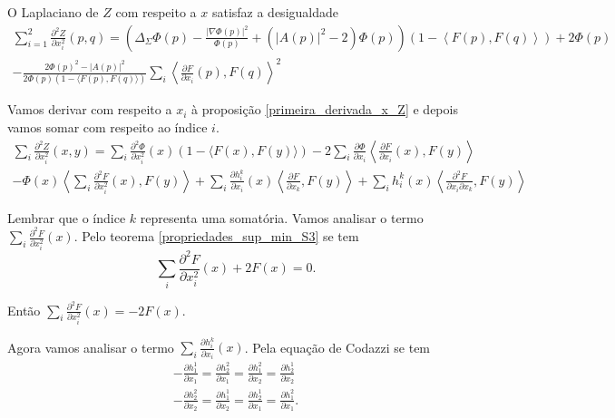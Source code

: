 \begin{proposicao}
	O Laplaciano de $Z$ com respeito a $x$ satisfaz a desigualdade
	\begin{multline*}
		\sum_{i=1}^{2} \frac{\partial^2 Z}{\partial x_i^2} (p,q) = \left( \Delta_{\Sigma} \Phi(p) - \frac{| \nabla \Phi(p) |^2}{\Phi(p)} + (|A(p)|^2 - 2) \Phi(p) \right) (1 - \left\langle F(p), F(q) \right\rangle) + 2 \Phi(p)\\
		 - \frac{2 \Phi(p)^2 - |A(p)|^2}{2 \Phi(p) (1 - \langle F(p), F(q) \rangle)} \sum_i \left\langle \frac{\partial F}{\partial x_i}(p), F(q) \right\rangle^2
	\end{multline*}
\end{proposicao}

\begin{demonstracao}
	Vamos derivar com respeito a $x_i$ à proposição \ref{primeira_derivada_x_Z} e depois vamos somar com respeito ao índice $i$.
	\begin{multline}\label{Z_seg_dev_x}
		\sum_i \frac{\partial^2 Z}{\partial x_i^2}(x,y) = \sum_i \frac{\partial^2 \Phi}{\partial x_i^2}(x)(1 - \langle F(x), F(y) \rangle) -2  \sum_i \frac{\partial \Phi}{\partial x_i} \left\langle \frac{\partial F}{\partial x_i}(x), F(y) \right\rangle\\
		 -  \Phi(x) \left\langle \sum_i \frac{\partial^2 F}{\partial x_i^2}(x), F(y) \right\rangle + \sum_i \frac{\partial h_i^k}{\partial x_i}(x) \left\langle \frac{\partial F}{\partial x_k}, F(y) \right\rangle + \sum_i h_i^k(x) \left\langle \frac{\partial^2 F}{\partial x_i \partial x_k}, F(y) \right\rangle
	\end{multline}
	
	Lembrar que o índice $k$ representa uma somatória. Vamos analisar o termo $\sum_i \frac{\partial^2 F}{\partial x_i^2}(x)$. Pelo teorema \ref{propriedades_sup_min_S3} se tem
	\begin{equation*}
		\sum_i \frac{\partial^2 F}{\partial x_i^2}(x) + 2 F(x) = 0.
	\end{equation*}
	
	Então $\sum_i \frac{\partial^2 F}{\partial x_i^2}(x) = -2 F(x) $.
	
	Agora vamos analisar o termo $\sum_i \frac{\partial h_i^k}{\partial x_i}(x)$. Pela equação de Codazzi se tem
	\begin{align*}
		-\frac{\partial h_1^1}{\partial x_1} = \frac{\partial h_2^2}{\partial x_1} = \frac{\partial h_1^2}{\partial x_2} = \frac{\partial h_2^1}{\partial x_2}\\
		-\frac{\partial h_2^2}{\partial x_2} = \frac{\partial h_1^1}{\partial x_2} = \frac{\partial h_2^1}{\partial x_1} = \frac{\partial h_1^2}{\partial x_1}.
	\end{align*}
	

\end{demonstracao}
